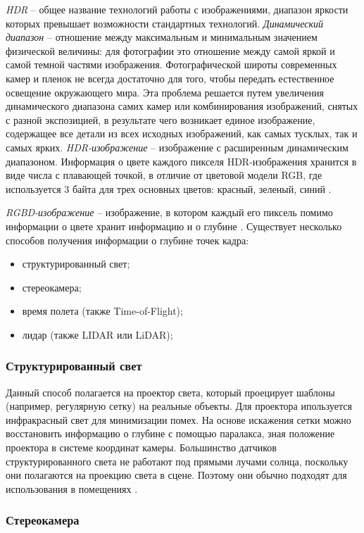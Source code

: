 \textit{HDR} -- общее название технологий работы с изображениями, диапазон яркости которых превышает возможности стандартных технологий. \textit{Динамический диапазон} -- отношение между максимальным и минимальным значением физической величины: для фотографии это отношение между самой яркой и самой темной частями изображения. Фотографической широты современных камер и пленок не всегда достаточно для того, чтобы передать естественное освещение окружающего мира. Эта проблема решается путем увеличения динамического диапазона самих камер или комбинирования изображений, снятых с разной экспозицией, в результате чего возникает единое изображение, содержащее все детали из всех исходных изображений, как самых тусклых, так и самых ярких. \textit{HDR-изображение} -- изображение с расширенным динамическим диапазоном. Информация о цвете каждого пикселя HDR-изображения хранится в виде числа с плавающей точкой, в отличие от цветовой модели RGB, где используется 3 байта для трех основных цветов: красный, зеленый, синий \cite{hdri}.

\textit{RGBD-изображение} -- изображение, в котором каждый его пиксель помимо информации о цвете хранит информацию и о глубине \cite{rgbd}. Существует несколько способов получения информации о глубине точек кадра:

\begin{itemize}
	\item структурированный свет;
	\item стереокамера;
	\item время полета (также Time-of-Flight);
	\item лидар (также LIDAR или LiDAR);
\end{itemize}

\subsubsection*{Структурированный свет}

Данный способ полагается на проектор света, который проецирует шаблоны (например, регулярную сетку) на реальные объекты. Для проектора ипользуется инфракрасный свет для минимизации помех. На основе искажения сетки можно восстановить информацию о глубине с помощью паралакса, зная положение проектора в системе координат камеры. Большинство датчиков структурированного света не работают под прямыми лучами солнца, поскольку они полагаются на проекцию света в сцене. Поэтому они обычно подходят для использования в помещениях \cite{rgbd}.

\subsubsection*{Стереокамера}

